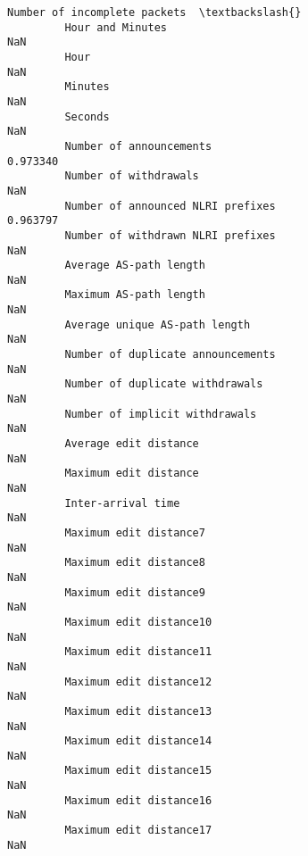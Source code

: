 \documentclass[11pt]{article}
\begin{document}
\begin{Verbatim}[commandchars=\\\{\}]
                                                            Number of incomplete packets  \textbackslash{}
         Hour and Minutes                                                            NaN   
         Hour                                                                        NaN   
         Minutes                                                                     NaN   
         Seconds                                                                     NaN   
         Number of announcements                                                0.973340   
         Number of withdrawals                                                       NaN   
         Number of announced NLRI prefixes                                      0.963797   
         Number of withdrawn NLRI prefixes                                           NaN   
         Average AS-path length                                                      NaN   
         Maximum AS-path length                                                      NaN   
         Average unique AS-path length                                               NaN   
         Number of duplicate announcements                                           NaN   
         Number of duplicate withdrawals                                             NaN   
         Number of implicit withdrawals                                              NaN   
         Average edit distance                                                       NaN   
         Maximum edit distance                                                       NaN   
         Inter-arrival time                                                          NaN   
         Maximum edit distance7                                                      NaN   
         Maximum edit distance8                                                      NaN   
         Maximum edit distance9                                                      NaN   
         Maximum edit distance10                                                     NaN   
         Maximum edit distance11                                                     NaN   
         Maximum edit distance12                                                     NaN   
         Maximum edit distance13                                                     NaN   
         Maximum edit distance14                                                     NaN   
         Maximum edit distance15                                                     NaN   
         Maximum edit distance16                                                     NaN   
         Maximum edit distance17                                                     NaN   

\end{Verbatim}
\end{document}

